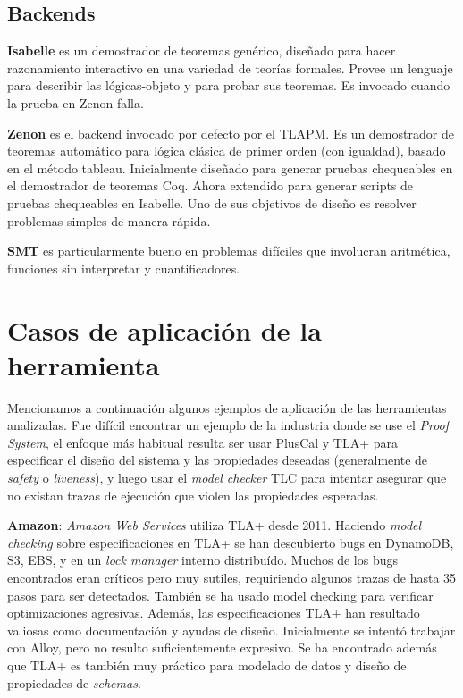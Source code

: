\documentclass[spanish]{llncs}
\begin{document}
  \subsection{Backends}
\textbf{Isabelle} es un demostrador de teoremas genérico, diseñado para hacer razonamiento interactivo en una variedad de teorías formales. 
Provee un lenguaje para describir las lógicas-objeto y para probar sus teoremas. Es invocado cuando la prueba en Zenon falla.\cite{verifyingsafety}

\textbf{Zenon} es el backend invocado por defecto por el TLAPM. Es un demostrador de teoremas automático para lógica clásica de primer orden (con igualdad), 
basado en el método tableau. Inicialmente diseñado para generar pruebas chequeables en el demostrador de teoremas Coq. Ahora extendido para generar scripts de pruebas chequeables 
en Isabelle. Uno de sus objetivos de diseño es resolver problemas simples de manera rápida.\cite{zenon}

\textbf{SMT} es particularmente bueno en problemas difíciles que involucran aritmética, funciones sin interpretar y cuantificadores.\cite{formaltech}

\section{Casos de aplicación de la herramienta}
Mencionamos a continuación algunos ejemplos de aplicación de las herramientas analizadas.
Fue difícil encontrar un ejemplo de la industria donde se use el \textit{Proof System}, el enfoque más habitual resulta ser usar PlusCal y TLA+ para especificar el diseño del sistema y las propiedades deseadas (generalmente de \textit{safety} o \textit{liveness}), y luego usar el \textit{model checker} TLC para intentar asegurar que no existan trazas de ejecución que violen las propiedades esperadas.

\textbf{Amazon}: \textit{Amazon Web Services} utiliza TLA+ desde 2011. Haciendo \textit{model checking} sobre especificaciones en TLA+ se han descubierto bugs
en DynamoDB, S3, EBS, y en un \textit{lock manager} interno distribuído.
Muchos de los bugs encontrados eran críticos pero muy sutiles, requiriendo algunos trazas de hasta 35 pasos para ser detectados.
También se ha usado model checking para verificar optimizaciones agresivas.
Además, las especificaciones TLA+ han resultado valiosas como documentación y ayudas de diseño.
Inicialmente se intentó trabajar con Alloy, pero no resulto suficientemente expresivo.
Se ha encontrado además que TLA+ es también muy práctico para modelado de datos y diseño de propiedades de \textit{schemas}. \cite{amazon}
\end{document}
